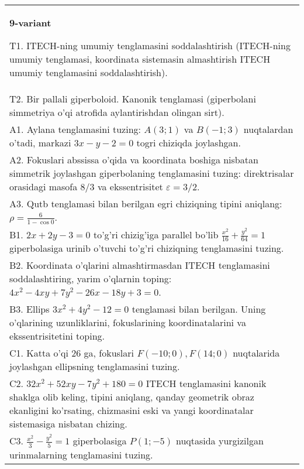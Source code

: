 \documentclass{article}
\begin{document}
\begin{tabular}{m{17cm}}
\textbf{9-variant}
\newline

T1. ITECH-ning umumiy tenglamasini soddalashtirish (ITECH-ning umumiy tenglamasi, koordinata sistemasin almashtirish ITECH umumiy tenglamasini soddalashtirish).\\

T2. Bir pallali giperboloid. Kanonik tenglamasi (giperbolani simmetriya o'qi atrofida aylantirishdan olingan sirt).\\

A1. Aylana tenglamasini tuzing: $A(3;1)$ va $B(-1;3)$ nuqtalardan o'tadi, markazi $3x-y-2=0$ togri chiziqda joylashgan.\\

A2. Fokuslari abssissa o'qida va koordinata boshiga nisbatan simmetrik joylashgan giperbolaning tenglamasini tuzing: direktrisalar orasidagi masofa $8/3$ va ekssentrisitet $\varepsilon=3/2$.\\

A3. Qutb tenglamasi bilan berilgan egri chiziqning tipini aniqlang: $\rho=\frac{6}{1-\cos 0}$.\\

B1. $2x + 2y - 3 = 0$ to'g'ri chizig'iga parallel bo'lib $\frac{x^{2}}{16} + \frac{y^{2}}{64} = 1$ giperbolasiga urinib o'tuvchi to'g'ri chiziqning tenglamasini tuzing.  \\

B2. Koordinata o'qlarini almashtirmasdan ITECH tenglamasini soddalashtiring, yarim o'qlarnin toping: $4x^{2} - 4xy + 7y^{2} - 26x - 18y + 3 = 0$.\\

B3. Ellips $3x^{2} + 4y^{2} - 12 = 0$ tenglamasi bilan berilgan. Uning o'qlarining uzunliklarini, fokuslarining koordinatalarini va ekssentrisitetini toping.  \\

C1. Katta o'qi 26 ga, fokuslari $F( - 10;0), F(14;0)$ nuqtalarida joylashgan ellipsning tenglamasini tuzing.  \\

C2. $32x^{2} + 52xy - 7y^{2} + 180 = 0$ ITECH tenglamasini kanonik shaklga olib keling, tipini aniqlang, qanday geometrik obraz ekanligini ko'rsating, chizmasini eski va yangi koordinatalar sistemasiga nisbatan chizing.  \\

C3. $\frac{x^{2}}{3} - \frac{y^{2}}{5} = 1$ giperbolasiga $P(1; - 5)$ nuqtasida yurgizilgan urinmalarning tenglamasini tuzing.\\

\end{tabular}
\vspace{1cm}
\end{document}
